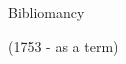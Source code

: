 \documentclass{beamer}
\begin{document}
\begin{frame}[plain]
\end{frame}


\begin{frame}[c]
	\centering
	\Huge
	Bibliomancy
	
	(1753 - as a term)
\end{frame}
\end{document}
